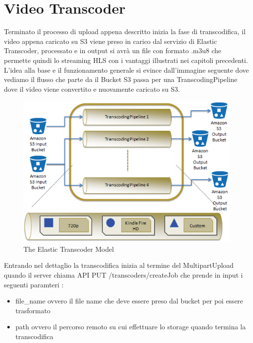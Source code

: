 \section{Video Transcoder}
\label{sec:video_transcoder}


Terminato il processo di upload appena descritto inizia la fase di transcodifica, il video appena caricato su S3 viene preso in carico dal servizio di Elastic Transcoder, processato e in output si avrà un file con formato .m3u8 che permette quindi lo streaming HLS con i vantaggi illustrati nei capitoli precedenti. L’idea alla base e il funzionamento generale si evince dall’immagine seguente dove vediamo il flusso che parte da il Bucket S3 passa per una TranscodingPipeline dove il video viene convertito e nuovamente caricato su S3. 

\begin{figure}[htb]
 \centering
 \includegraphics[width=1.0\linewidth]{images/chapter6/elastic_transcode_model.png}\hfill
 \caption[The Elastic Transcoder Model]{The Elastic Transcoder Model}
 \label{fig:fourV}
\end{figure}

Entrando nel dettaglio la transcodifica inizia al termine del MultipartUpload quando il server chiama API PUT /transcoders/createJob che prende in input i seguenti paramteri :
\begin{itemize}
      \item file\_name ovvero il file name che deve essere preso dal bucket per poi essere trasformato
      \item path ovvero il percorso remoto su cui effettuare lo storage quando termina la transcodifica
  \end{itemize}

